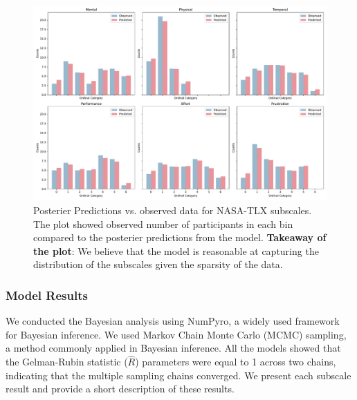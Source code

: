 \begin{figure}[h!]
    \centering
    \includegraphics[width=\textwidth]{content/image/cog/observed_vs_predicted_all_subscale.pdf}
    \caption{Posterier Predictions vs. observed data for NASA-TLX subscales. The plot showed observed number of participants in each bin compared to the posterier predictions from the model. \textbf{Takeaway of the plot}: We believe that the model is reasonable at capturing the distribution of the subscales given the sparsity of the data.}
    \label{fig:observed_vs_predicted_all_subscale}
\end{figure}

\subsubsection{Model Results}
We conducted the Bayesian analysis using NumPyro, a widely used framework for Bayesian inference. We used Markov Chain Monte Carlo (MCMC) sampling, a method commonly applied in Bayesian inference. All the models showed that the Gelman-Rubin statistic ($\hat{R}$) parameters were equal to 1 across two chains, indicating that the multiple sampling chains converged. We present each subscale result and provide a short description of these results.

